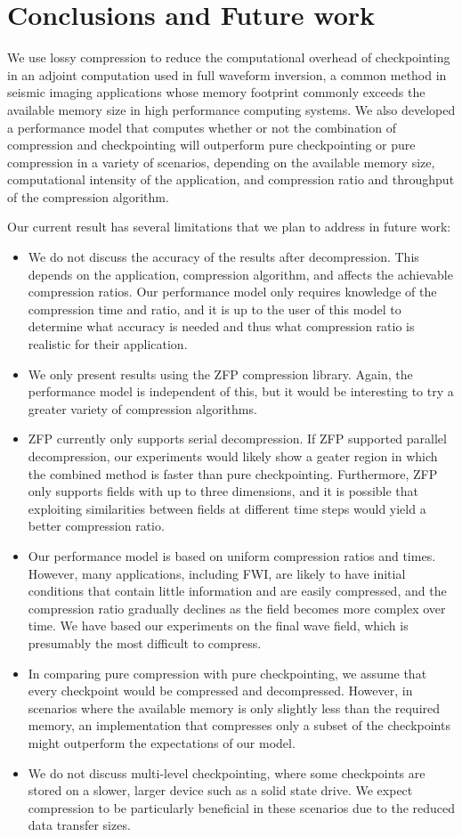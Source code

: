 \documentclass[conference]{IEEEtran}
\begin{document}
\section{Conclusions and Future work}
We use lossy compression to reduce the computational overhead of checkpointing
in an adjoint computation used in full waveform inversion, a common method in
seismic imaging applications whose memory footprint commonly exceeds the
available memory size in high performance computing systems. We also developed a
performance model that computes whether or not the combination of compression
and checkpointing will outperform pure checkpointing or pure compression in a
variety of scenarios, depending on the available memory size, computational
intensity of the application, and compression ratio and throughput of the
compression algorithm.

Our current result has several limitations that we plan to address in future
work:
\begin{itemize}
\item We do not discuss the accuracy of the results after decompression. This
depends on the application, compression algorithm, and affects the achievable
compression ratios. Our performance model only requires knowledge of the
compression time and ratio, and it is up to the user of this model to determine
what accuracy is needed and thus what compression ratio is realistic for their
application.
\item We only present results using the ZFP compression library. Again, the
performance model is independent of this, but it would be interesting to try a
greater variety of compression algorithms.
\item ZFP currently only supports serial decompression. If ZFP supported
parallel decompression, our experiments would likely show a geater region in
which the combined method is faster than pure checkpointing. Furthermore, ZFP
only supports fields with up to three dimensions, and it is possible that
exploiting similarities between fields at different time steps would yield a
better compression ratio.
\item Our performance model is based on uniform compression ratios and times.
However, many applications, including FWI, are likely to have initial conditions
that contain little information and are easily compressed, and the compression
ratio gradually declines as the field becomes more complex over time. We have
based our experiments on the final wave field, which is presumably the most
difficult to compress.
\item In comparing pure compression with pure checkpointing, we assume that
every checkpoint would be compressed and decompressed. However, in scenarios
where the available memory is only slightly less than the required memory, an
implementation that compresses only a subset of the checkpoints might outperform
the expectations of our model. 
\item We do not discuss multi-level checkpointing, where some checkpoints are
stored on a slower, larger device such as a solid state drive. We expect
compression to be particularly beneficial in these scenarios due to the reduced
data transfer sizes.
\end{itemize}
\end{document}
